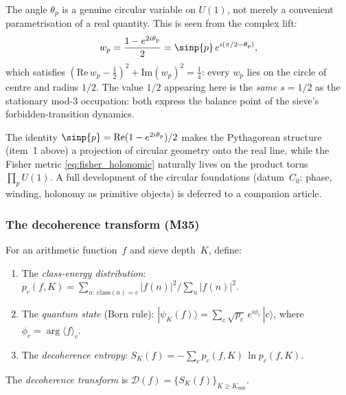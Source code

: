 \documentclass[12pt,a4paper]{article}
\begin{document}
\begin{remark}\mBR
\label{rem:circular_reading}
The angle $\theta_p$ is a genuine circular variable on $U(1)$, not
merely a convenient parametrisation of a real quantity.  This is seen
from the complex lift:
\begin{equation}
  w_p = \frac{1 - e^{2i\theta_p}}{2}
  = \sinp{p}\,e^{i(\pi/2 - \theta_p)},
  \label{eq:complex_lift}
\end{equation}
which satisfies $(\mathrm{Re}\,w_p - \tfrac{1}{2})^2
+ \mathrm{Im}(w_p)^2 = \tfrac{1}{4}$: every $w_p$ lies on the
circle of centre and radius $1/2$.  The value $1/2$ appearing here
is the \emph{same} $s = 1/2$ as the stationary mod-3 occupation:
both express the balance point of the sieve's forbidden-transition
dynamics.

The identity $\sinp{p} = \mathrm{Re}(1 - e^{2i\theta_p})/2$
makes the Pythagorean structure (item~1 above) a projection of
circular geometry onto the real line, while the Fisher metric
\eqref{eq:fisher_holonomic} naturally lives on the product torus
$\prod_p U(1)$.  A full development of the circular foundations
(datum~$C_0$: phase, winding, holonomy as primitive objects) is
deferred to a companion article.
\end{remark}

\subsubsection{The decoherence transform (M35)}
\label{sec:ms_decoherence_transform}

\begin{definition}
\label{def:decoherence_transform}
For an arithmetic function~$f$ and sieve depth~$K$, define:
\begin{enumerate}[nosep]
\item The \emph{class-energy distribution}:
  $p_c(f,K) = \sum_{n:\,\mathrm{class}(n)=c} |f(n)|^2
   \big/ \sum_n |f(n)|^2$.
\item The \emph{quantum state} (Born rule):
  $|\psi_K(f)\rangle = \sum_c \sqrt{p_c}\,e^{i\phi_c}\,|c\rangle$,
  where $\phi_c = \arg\langle f \rangle_c$.
\item The \emph{decoherence entropy}:
  $S_K(f) = -\sum_c p_c(f,K)\,\ln p_c(f,K)$.
\end{enumerate}
The \emph{decoherence transform} is $\mathcal{D}(f)
= \{S_K(f)\}_{K \geq K_{\min}}$.
\end{definition}
\end{document}
